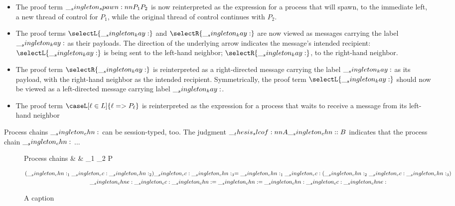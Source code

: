 \begin{itemize}
\item The proof term $\__singleton_spawn:nn {P_1} {P_2}$ is now reinterpreted as the expression for a process that will spawn, to the immediate left, a new thread of control for $P_1$, while the original thread of control continues with $P_2$.

\item The proof terms $\selectL{\kay}$ and $\selectR{\kay}$ are now viewed as messages carrying the label $\__singleton_kay:$ as their payloads.
  The direction of the underlying arrow
  indicates the message's intended recipient: $\selectL{\kay}$ is being sent to the left-hand neighbor; $\selectR{\kay}$, to the right-hand neighbor.

\item The proof term $\selectR{\kay}$ is reinterpreted as a right-directed message carrying the label $\__singleton_kay:$ as its payload, with the right-hand neighbor as the intended recipient.
  Symmetrically, the proof term $\selectL{\kay}$ should now be viewed as a left-directed message carrying label $\__singleton_kay:$.

\item The proof term $\caseL[\ell \in L]{\ell => P_{\ell}}$ is reinterpreted as the expression for a process that waits to receive a message from its left-hand neighbor
\end{itemize}


Process chains $\__singleton_chn:$ can be session-typed, too.
The judgment $\slcof{A |- \chn : B}$ indicates that the process chain $\__singleton_chn:$ ...
\begin{figure}[tbp]
  \begin{syntax*}
    Process chains &
      \chn & \chne \mid \chn_1 \cc \chn_2 \mid P
  \end{syntax*}

  \begin{gather*}
    (\__singleton_chn:_1 \__singleton_cc: \__singleton_chn:_2) \__singleton_cc: \__singleton_chn:_3 = \__singleton_chn:_1 \__singleton_cc: (\__singleton_chn:_2 \__singleton_cc: \__singleton_chn:_3) \\
    \__singleton_chne: \__singleton_cc: \__singleton_chn: = \__singleton_chn: = \__singleton_chn: \__singleton_cc: \__singleton_chne:
  \end{gather*}

  \caption{A caption}
\end{figure}

